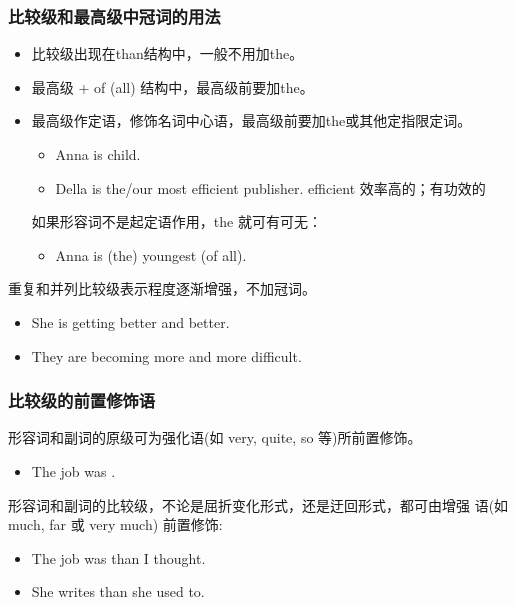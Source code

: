 \subsubsection{比较级和最高级中冠词的用法}

\begin{itemize}
\item 比较级出现在than结构中，一般不用加the。


\item 最高级 + of (all) 结构中，最高级前要加the。

\item 最高级作定语，修饰名词中心语，最高级前要加the或其他定指限定词。
  \begin{itemize}
  \item Anna is  child.

  \item Della is the/our most efficient publisher. \quad efficient
     效率高的；有功效的
  \end{itemize}

  如果形容词不是起定语作用，the 就可有可无：
  \begin{itemize}
  \item Anna is (the) youngest (of all).
  \end{itemize}
\end{itemize}

重复和并列比较级表示程度逐渐增强，不加冠词。
\begin{itemize}
\item She is getting better and better.

\item They are becoming more and more difficult.
\end{itemize}


\subsubsection{比较级的前置修饰语}

形容词和副词的原级可为强化语(如 very, quite, so 等)所前置修饰。
\begin{itemize}
\item The job was .
\end{itemize}

形容词和副词的比较级，不论是屈折变化形式，还是迂回形式，都可由增强
语(如 much, far 或 very much) 前置修饰:
\begin{itemize}
\item The job was  than I thought.
\item She writes  than she used to.
\end{itemize}

